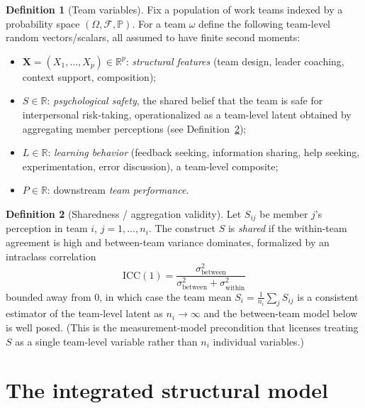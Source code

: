 \documentclass{amsart}
\theoremstyle{definition}
\newtheorem{definition}{Definition}
\theoremstyle{plain}
\begin{document}
\begin{definition}[Team variables]\label{def:vars}
Fix a population of work teams indexed by a probability space $(\Omega,\mathcal F,\mathbb P)$.
For a team $\omega$ define the following team-level random vectors/scalars, all assumed to
have finite second moments:
\begin{itemize}
\item $\bm X=(X_1,\dots,X_p)\in\mathbb R^p$: \emph{structural features}
(team design, leader coaching, context support, composition);
\item $S\in\mathbb R$: \emph{psychological safety}, the shared belief that the team is safe
for interpersonal risk-taking, operationalized as a team-level latent obtained by
aggregating member perceptions (see Definition~\ref{def:shared});
\item $L\in\mathbb R$: \emph{learning behavior} (feedback seeking, information sharing,
help seeking, experimentation, error discussion), a team-level composite;
\item $P\in\mathbb R$: downstream \emph{team performance}.
\end{itemize}
\end{definition}

\begin{definition}[Sharedness / aggregation validity]\label{def:shared}
Let $S_{ij}$ be member $j$'s perception in team $i$, $j=1,\dots,n_i$. The construct $S$ is
\emph{shared} if the within-team agreement is high and between-team variance dominates,
formalized by an intraclass correlation
\[
\mathrm{ICC}(1)=\frac{\sigma^2_{\text{between}}}{\sigma^2_{\text{between}}+\sigma^2_{\text{within}}}
\]
bounded away from $0$, in which case the team mean $S_i=\frac1{n_i}\sum_j S_{ij}$ is a
consistent estimator of the team-level latent as $n_i\to\infty$ and the between-team model
below is well posed. (This is the measurement-model precondition that licenses treating $S$
as a single team-level variable rather than $n_i$ individual variables.)
\end{definition}

\section{The integrated structural model}
\end{document}
